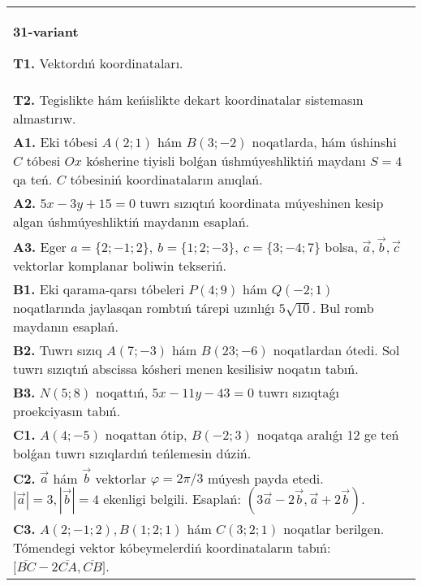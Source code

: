 \documentclass{article}
\begin{document}
\begin{tabular}{m{17cm}}
\textbf{31-variant}

\textbf{T1.} 
Vektordıń koordinataları.
 \\
\textbf{T2.} 
Tegislikte hám keńislikte dekart koordinatalar sistemasın almastırıw.
 \\
\textbf{A1.} 
Eki tóbesi $A (2;1) $ hám $B (3;-2) $ noqatlarda, hám
úshinshi $C$ tóbesi $Ox$ kósherine tiyisli bolǵan úshmúyeshliktiń
maydanı $S=4$ qa teń. $C$ tóbesiniń koordinataların anıqlań.
 \\
\textbf{A2.} 
$5x-3y+15=0$ tuwrı sızıqtıń koordinata múyeshinen
kesip algan úshmúyeshliktiń maydanın esaplań.
 \\
\textbf{A3.} 
Eger \(a = \{ 2; - 1;2\}, \ b = \{ 1;2; - 3\}, \ c = \{ 3; - 4;7\}\) bolsa, $\overrightarrow{a}, \overrightarrow{b}, \overrightarrow{c}$ vektorlar komplanar boliwin tekseriń.
 \\
\textbf{B1.} 
Eki qarama-qarsı tóbeleri \(P (4;9) \) hám \(Q (-2; 1) \) noqatlarında jaylasqan rombtıń tárepi uzınlıǵı \(5\sqrt{10}\). Bul
romb maydanın esaplań.
 \\
\textbf{B2.} 
Tuwrı sızıq \(A (7;-3) \) hám \(B (23;-6) \) noqatlardan ótedi.
Sol tuwrı sızıqtıń abscissa kósheri menen kesilisiw noqatın tabıń.
 \\
\textbf{B3.} 
\(N (5;8) \) noqattıń, \(5x-11y-43=0\) tuwrı sızıqtaǵı
proekciyasın tabıń.
 \\
\textbf{C1.} 
\(A (4;-5) \) noqattan ótip, \(B (-2;3) \) noqatqa
aralıǵı 12 ge teń bolǵan tuwrı sızıqlardıń teńlemesin dúziń.
 \\
\textbf{C2.} 
$\vec{a}$ hám $\vec{b}$ vektorlar $\varphi = 2\pi/3$ múyesh payda etedi. $|\vec{a}| = 3,|\vec{b}| = 4$ ekenligi belgili. Esaplań:
$\left(3\vec{a} - 2\vec{b},\vec{a} + 2\vec{b} \right) $.
 \\
\textbf{C3.} 
$A (2; -1;2), B (1;2; 1) $ hám $C (3;2;1) $ noqatlar berilgen. Tómendegi vektor kóbeymelerdiń koordinataların tabıń:
$\lbrack\overline{BC} - 2\overline{CA},\overline{CB}\rbrack$. \\

\end{tabular}
\vspace{1cm}
\end{document}

